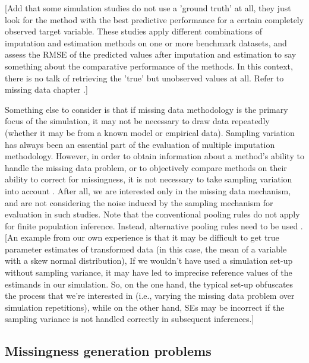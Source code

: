 \documentclass[bimj,fleqn]{w-art}
\theoremstyle{plain}
\theoremstyle{definition}
\begin{document}
[Add that some simulation studies do not use a 'ground truth' at all, they just look for the method with the best predictive performance for a certain completely observed target variable. These studies apply different combinations of imputation and estimation methods on one or more benchmark datasets, and assess the RMSE of the predicted values after imputation and estimation to say something about the comparative performance of the methods. In this context, there is no talk of retrieving the 'true' but unobserved values at all. Refer to missing data chapter \citep{liu21}.]

Something else to consider is that if missing data methodology is the primary focus of the simulation, it may not be necessary to draw data repeatedly (whether it may be from a known model or empirical data). Sampling variation has always been an essential part of the evaluation of multiple imputation methodology. However, in order to obtain information about a method's ability to handle the missing data problem, or to objectively compare methods on their ability to correct for missingness, it is not necessary to take sampling variation into account \citep{vink14}. After all, we are interested only in the missing data mechanism, and are not considering the noise induced by the sampling mechanism for evaluation in such studies. Note that the conventional pooling rules \citep[cf.][p. 76-77]{rubi87} do not apply for finite population inference. Instead, alternative pooling rules need to be used \citep{raghunathan2003multiple,vink14}. [An example from our own experience is that it may be difficult to get true parameter estimates of transformed data (in this case, the mean of a variable with a skew normal distribution), If we wouldn't have used a simulation set-up without sampling variance, it may have led to imprecise reference values of the estimands in our simulation. So, on the one hand, the typical set-up obfuscates the process that we're interested in (i.e., varying the missing data problem over simulation repetitions), while on the other hand, SEs may be incorrect if the sampling variance is not handled correctly in subsequent inferences.] %



\subsection{Missingness generation problems}
\end{document}
